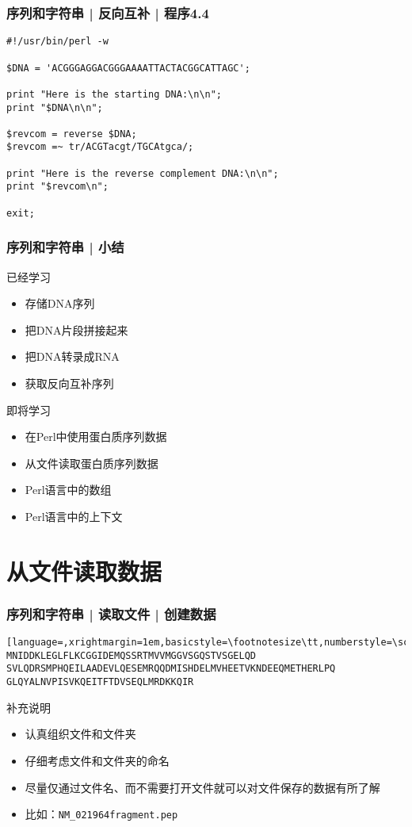\begin{frame}[fragile]
  \frametitle{序列和字符串 | 反向互补 | \alert{程序4.4}}
\begin{lstlisting}
#!/usr/bin/perl -w

$DNA = 'ACGGGAGGACGGGAAAATTACTACGGCATTAGC';

print "Here is the starting DNA:\n\n";
print "$DNA\n\n";

$revcom = reverse $DNA;
$revcom =~ tr/ACGTacgt/TGCAtgca/;

print "Here is the reverse complement DNA:\n\n";
print "$revcom\n";

exit;
\end{lstlisting}
\end{frame}

\begin{frame}
  \frametitle{序列和字符串 | 小结}
  \begin{block}{已经学习}
    \begin{itemize}
      \item 存储DNA序列
      \item 把DNA片段拼接起来
      \item 把DNA转录成RNA
      \item 获取反向互补序列
    \end{itemize}
  \end{block}
  \pause
  \begin{block}{即将学习}
    \begin{itemize}
      \item 在Perl中使用蛋白质序列数据
      \item 从文件读取蛋白质序列数据
      \item Perl语言中的数组
      \item Perl语言中的上下文
    \end{itemize}
  \end{block}
\end{frame}

\section{从文件读取数据}
\begin{frame}[fragile]
  \frametitle{序列和字符串 | 读取文件 | 创建数据}
\begin{lstlisting}[language=,xrightmargin=1em,basicstyle=\footnotesize\tt,numberstyle=\scriptsize]
MNIDDKLEGLFLKCGGIDEMQSSRTMVVMGGVSGQSTVSGELQD
SVLQDRSMPHQEILAADEVLQESEMRQQDMISHDELMVHEETVKNDEEQMETHERLPQ
GLQYALNVPISVKQEITFTDVSEQLMRDKKQIR
\end{lstlisting}
\pause
\begin{block}{补充说明}
  \begin{itemize}
    \item 认真组织文件和文件夹
    \item 仔细考虑文件和文件夹的命名
    \item 尽量仅通过文件名、而不需要打开文件就可以对文件保存的数据有所了解
    \item 比如：\verb|NM_021964fragment.pep|
  \end{itemize}
\end{block}
\end{frame}

